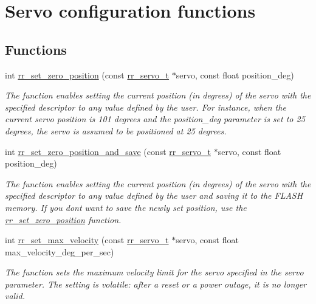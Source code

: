 \hypertarget{group___servo__config}{}\section{Servo configuration functions}
\label{group___servo__config}
\subsection*{Functions}
\begin{DoxyCompactItemize}
\item 
int \hyperlink{group___servo__config_gab68e78b8a0d2a9ac38b9a72d78acab85}{rr\+\_\+set\+\_\+zero\+\_\+position} (const \hyperlink{structrr__servo__t}{rr\+\_\+servo\+\_\+t} $\ast$servo, const float position\+\_\+deg)
\begin{DoxyCompactList}\small\item\em The function enables setting the current position (in degrees) of the servo with the specified descriptor to any value defined by the user. For instance, when the current servo position is 101 degrees and the \textquotesingle{}position\+\_\+deg\textquotesingle{} parameter is set to 25 degrees, the servo is assumed to be positioned at 25 degrees. \end{DoxyCompactList}\item 
int \hyperlink{group___servo__config_ga7ccc75e00e431b8a57150a71791488c3}{rr\+\_\+set\+\_\+zero\+\_\+position\+\_\+and\+\_\+save} (const \hyperlink{structrr__servo__t}{rr\+\_\+servo\+\_\+t} $\ast$servo, const float position\+\_\+deg)
\begin{DoxyCompactList}\small\item\em The function enables setting the current position (in degrees) of the servo with the specified descriptor to any value defined by the user and saving it to the F\+L\+A\+SH memory. If you don\textquotesingle{}t want to save the newly set position, use the \hyperlink{group___servo__config_gab68e78b8a0d2a9ac38b9a72d78acab85}{rr\+\_\+set\+\_\+zero\+\_\+position} function.~\newline
 \end{DoxyCompactList}\item 
int \hyperlink{group___servo__config_ga18d5d9dc728f7cb8e7674b9e9b275aca}{rr\+\_\+set\+\_\+max\+\_\+velocity} (const \hyperlink{structrr__servo__t}{rr\+\_\+servo\+\_\+t} $\ast$servo, const float max\+\_\+velocity\+\_\+deg\+\_\+per\+\_\+sec)
\begin{DoxyCompactList}\small\item\em The function sets the maximum velocity limit for the servo specified in the \textquotesingle{}servo\textquotesingle{} parameter. The setting is volatile\+: after a reset or a power outage, it is no longer valid. \end{DoxyCompactList}\end{DoxyCompactItemize}


